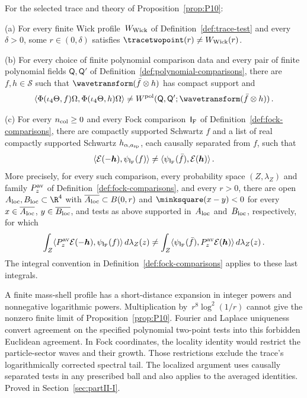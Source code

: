 \begin{proposition}\label{prop:P11}
For the selected trace and theory of Proposition~\ref{prop:P10}:

(a) For every finite Wick profile~$W_{\rm Wick}$ of Definition~\ref{def:trace-test} and every $\delta>0$, some $r\in(0,\delta)$ satisfies $\tracetwopoint(r)\ne W_{\rm Wick}(r)$.

(b) For every choice of finite polynomial comparison data and every pair of finite polynomial fields $\mathsf Q,\mathsf Q'$ of Definition~\ref{def:polynomial-comparisons}, there are $f,h\in\mathcal S$ such that $\wavetransform(\bar f\otimes h)$ has compact support and
\begin{equation}\label{eq:P11-1}
\langle\Phi(\iota_4\Theta,f)\Omega,\Phi(\iota_4\Theta,h)\Omega\rangle
\ne W^{\rm pol}(\mathsf Q,\mathsf Q';\wavetransform(\bar f\otimes h))\,.
\end{equation}

(c) For every $n_{\rm col}\ge0$ and every Fock comparison~$\mathsf I_{\rm F}$ of Definition~\ref{def:fock-comparisons}, there are compactly supported Schwartz $f$ and a list of real compactly supported Schwartz $h_{\alpha,a_{\rm sp}}$, each causally separated from $f$, such that
\begin{equation}\label{eq:P11-2}
\langle\mathcal E(-\boldsymbol h),\psi_{\mathsf I_{\rm F}}(f)\rangle\ne\langle\psi_{\mathsf I_{\rm F}}(\bar f),\mathcal E(\boldsymbol h)\rangle\,.
\end{equation}
More precisely, for every such comparison, every probability space $(Z,\lambda_Z)$ and family $P_z^{\rm av}$ of Definition~\ref{def:fock-comparisons}, and every $r>0$, there are open $A_{\rm loc},B_{\rm loc}\subset\R^4$ with $\overline{A_{\rm loc}}\subset B(0,r)$ and $\minksquare(x-y)<0$ for every $x\in\overline{A_{\rm loc}}$, $y\in\overline{B_{\rm loc}}$, and tests as above supported in~$A_{\rm loc}$ and~$B_{\rm loc}$, respectively, for which
\begin{equation}\label{eq:P11-3}
\int_Z\langle P_z^{\rm av}\mathcal E(-\boldsymbol h),\psi_{\mathsf I_{\rm F}}(f)\rangle\,d\lambda_Z(z)
\ne\int_Z\langle\psi_{\mathsf I_{\rm F}}(\bar f),P_z^{\rm av}\mathcal E(\boldsymbol h)\rangle\,d\lambda_Z(z)\,.
\end{equation}
The integral convention in Definition~\ref{def:fock-comparisons} applies to these last integrals.
\end{proposition}

A finite mass-shell profile has a short-distance expansion in integer powers
and nonnegative logarithmic powers. Multiplication by~$r^8\log^2(1/r)$ cannot
give the nonzero finite limit of Proposition~\ref{prop:P10}. Fourier and Laplace
uniqueness convert agreement on the specified polynomial two-point tests into
this forbidden Euclidean agreement. In Fock coordinates, the locality identity
would restrict the particle-sector waves and their growth. Those restrictions
exclude the trace's logarithmically corrected spectral tail. The localized
argument uses causally separated tests in any prescribed ball and also applies
to the averaged identities. Proved in Section~\ref{sec:partII-I}.

